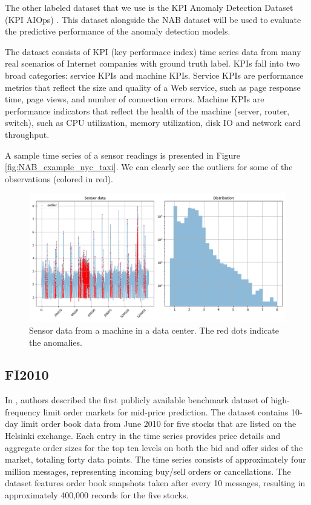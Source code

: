 \documentclass[a4paper, twoside]{report}
\theoremstyle{definition}
\numberwithin{equation}{section}
\begin{document}
The other labeled dataset that we use is the KPI Anomaly Detection Dataset (KPI AIOps) \cite{2208.03938}.
This dataset alongside the NAB dataset will be used to evaluate the predictive performance of the anomaly detection models.

The dataset consists of KPI (key performace index) time series data from many
real scenarios of Internet companies with ground truth label. KPIs fall into two
broad categories: service KPIs and machine KPIs. Service KPIs are performance metrics
that reflect the size and quality of a Web service, such as page response time, page views,
and number of connection errors. Machine KPIs are performance indicators that reflect
the health of the machine (server, router, switch), such as CPU utilization, memory utilization,
disk IO and network card throughput.

A sample time series of a sensor readings is presented in Figure \ref{fig:NAB_example_nyc_taxi}.
We can clearly see the outliers for some of the observations (colored in red).
\begin{figure}[h!]
    \centering
    \includegraphics[scale=0.48]{KPIAIOps_example.png}
    \caption{Sensor data from a machine in a data center. The red dots indicate the anomalies.}
    \label{fig:KPIAIOps_example}
\end{figure}

\subsection{FI2010}

In \cite{1705.03233}, authors described the first publicly available benchmark dataset of high-frequency limit order markets for mid-price prediction.
The dataset contains 10-day limit order book data from June 2010 for five stocks that are listed on the Helsinki exchange.
Each entry in the time series provides price details and aggregate order sizes for the top ten levels on both the bid and offer sides of the market,
totaling forty data points. The time series consists of approximately four million messages, representing incoming buy/sell orders or cancellations.
The dataset features order book snapshots taken after every 10 messages, resulting in approximately 400,000 records for the five stocks.
\end{document}

